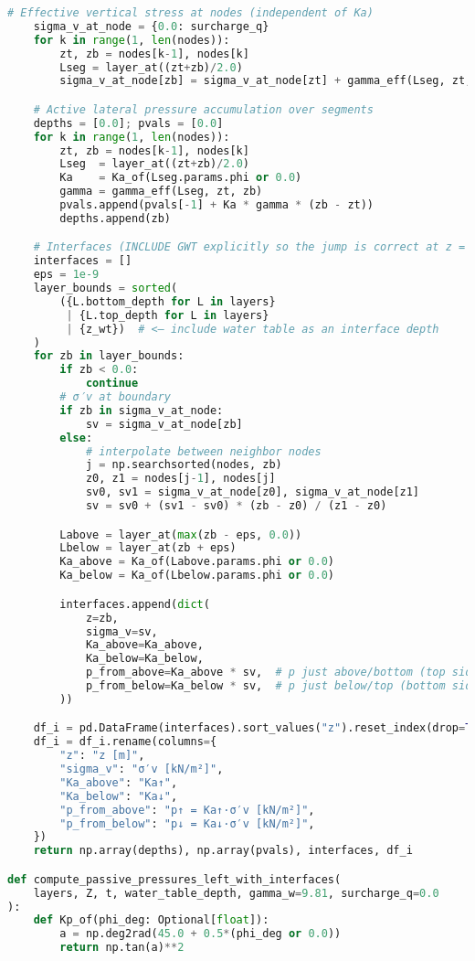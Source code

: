 \begin{lstlisting}[language=Python]
    # Effective vertical stress at nodes (independent of Ka)
    sigma_v_at_node = {0.0: surcharge_q}
    for k in range(1, len(nodes)):
        zt, zb = nodes[k-1], nodes[k]
        Lseg = layer_at((zt+zb)/2.0)
        sigma_v_at_node[zb] = sigma_v_at_node[zt] + gamma_eff(Lseg, zt, zb) * (zb - zt)

    # Active lateral pressure accumulation over segments
    depths = [0.0]; pvals = [0.0]
    for k in range(1, len(nodes)):
        zt, zb = nodes[k-1], nodes[k]
        Lseg  = layer_at((zt+zb)/2.0)
        Ka    = Ka_of(Lseg.params.phi or 0.0)
        gamma = gamma_eff(Lseg, zt, zb)
        pvals.append(pvals[-1] + Ka * gamma * (zb - zt))
        depths.append(zb)

    # Interfaces (INCLUDE GWT explicitly so the jump is correct at z = z_wt)
    interfaces = []
    eps = 1e-9
    layer_bounds = sorted(
        ({L.bottom_depth for L in layers}
         | {L.top_depth for L in layers}
         | {z_wt})  # <— include water table as an interface depth
    )
    for zb in layer_bounds:
        if zb < 0.0:
            continue
        # σ′v at boundary
        if zb in sigma_v_at_node:
            sv = sigma_v_at_node[zb]
        else:
            # interpolate between neighbor nodes
            j = np.searchsorted(nodes, zb)
            z0, z1 = nodes[j-1], nodes[j]
            sv0, sv1 = sigma_v_at_node[z0], sigma_v_at_node[z1]
            sv = sv0 + (sv1 - sv0) * (zb - z0) / (z1 - z0)

        Labove = layer_at(max(zb - eps, 0.0))
        Lbelow = layer_at(zb + eps)
        Ka_above = Ka_of(Labove.params.phi or 0.0)
        Ka_below = Ka_of(Lbelow.params.phi or 0.0)

        interfaces.append(dict(
            z=zb,
            sigma_v=sv,
            Ka_above=Ka_above,
            Ka_below=Ka_below,
            p_from_above=Ka_above * sv,  # p just above/bottom (top side of interface)
            p_from_below=Ka_below * sv,  # p just below/top (bottom side of interface)
        ))

    df_i = pd.DataFrame(interfaces).sort_values("z").reset_index(drop=True)
    df_i = df_i.rename(columns={
        "z": "z [m]",
        "sigma_v": "σ′v [kN/m²]",
        "Ka_above": "Ka↑",
        "Ka_below": "Ka↓",
        "p_from_above": "p↑ = Ka↑·σ′v [kN/m²]",
        "p_from_below": "p↓ = Ka↓·σ′v [kN/m²]",
    })
    return np.array(depths), np.array(pvals), interfaces, df_i

def compute_passive_pressures_left_with_interfaces(
    layers, Z, t, water_table_depth, gamma_w=9.81, surcharge_q=0.0
):
    def Kp_of(phi_deg: Optional[float]):
        a = np.deg2rad(45.0 + 0.5*(phi_deg or 0.0))
        return np.tan(a)**2


\end{lstlisting}
